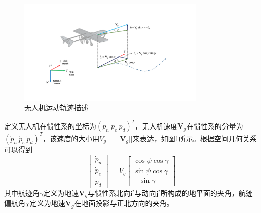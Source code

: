 \begin{figure}[htb]   
	\centering
	\includegraphics[width=0.8\textwidth]{figs/chp02/chp02_05_uav_course_frame.pdf}
	\caption{无人机运动轨迹描述}
	\label{fig:chp02_05_uav_course_frame}
\end{figure}

定义无人机在惯性系的坐标为$(p_n\ p_e\ p_d)^T$，无人机速度$\mathbf{V}_g$在惯性系的分量为$(\dot{p}_n\ \dot{p}_e\ \dot{p}_d)^T$，该速度的大小用$V_g = ||\mathbf{V}_g||$来表达，如图\ref{fig:chp02_05_uav_course_frame}所示。根据空间几何关系可以得到
\begin{equation}
	\begin{bmatrix} \dot{p}_n \\\dot{p}_e \\ \dot{p}_d \end{bmatrix}  = {V}_g \begin{bmatrix} \cos \psi \cos \gamma \\ \sin \psi \cos \gamma  \\- \sin \gamma \end{bmatrix}
\end{equation}
其中航迹角$\gamma$定义为地速$\mathbf{V}_g$与惯性系北向$\mathbf{i}^i$与动向$\mathbf{j}^i$所构成的地平面的夹角，航迹偏航角$\chi$定义为地速$\mathbf{V}_g$在地面投影与正北方向的夹角。

